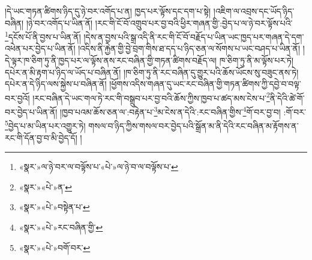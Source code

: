 །དེ་ཡང་གཏན་ཚིགས་ཉིད་དུ་ཉེ་བར་འགོད་པ་ན། ཁྱད་པར་ལྟོས་དང་དག་པ་སྟེ། །འཇིག་ལ་འབྲས་དང་ཡོད་ཉིད་བཞིན། །ཉེ་བར་འགོད་པ་ཡིན་ནོ། །རང་གི་ངོ་བོ་འགྲུབ་པར་བྱ་བའི་ཕྱིར་གཞན་གྱི་:བྱེད་པ་ལ་ཉེ་བར་ལྟོས་པའི་\footnote{«སྣར་»ལ་ཉེ་བར་ལ་བལྟོས་པ་«པེ་»ལ་ཉེ་བ་ལ་བལྟོས་པ་}དངོས་པོ་ནི་བྱས་པ་ཡིན་ནོ། །དེས་ན་བྱས་པའི་སྒྲ་འདི་ནི་རང་གི་ངོ་བོ་བརྗོད་པ་ཡིན་ཡང་ཁྱད་པར་གཞན་དེ་དག་འཕེན་པར་བྱེད་པ་ཡིན་ནོ། །འདིས་ནི་རྐྱེན་གྱི་བྱེ་བྲག་གིས་ཐ་དད་པ་ཉིད་ཅན་ལ་སོགས་པ་ཡང་བཤད་པ་ཡིན་ནོ། །དེ་ལྟར་ཁ་ཅིག་ཏུ་ནི་ཁྱད་པར་ལ་ལྟོས་ནས་རང་བཞིན་གྱི་གཏན་ཚིགས་བརྗོད་ལ། ཁ་ཅིག་ཏུ་ནི་མ་ལྟོས་པར་ཏེ། དཔེར་ན་མི་རྟག་པ་ཉིད་ལ་ཡོད་པ་བཞིན་ནོ། །ཁ་ཅིག་ཏུ་ནི་རང་བཞིན་དུ་གྱུར་པའི་ཆོས་ཡོངས་སུ་བཟུང་ནས་ཏེ། དཔེར་ན་དེ་ཉིད་ལས་སྐྱེས་པ་བཞིན་ནོ། །ཕྱོགས་འདིས་གཞན་དུ་ཡང་རང་བཞིན་གྱི་གཏན་ཚིགས་ཀྱི་དབྱེ་བ་བལྟ་བར་བྱའོ། །རང་བཞིན་དེ་ཡང་གལ་ཏེ་རང་གི་བསྒྲུབ་པར་བྱ་བའི་ཆོས་ཀྱིས་ཁྱབ་པ་ཚད་མས་ངེས་པ་\footnote{«སྣར་»«པེ་»ན་}ནི་དེའི་ཚེ་གོ་བར་བྱེད་པ་ཡིན་ནོ། །ཁྱབ་པའམ་ཆོས་ཅན་ལ་:བརྟེན་པ་\footnote{«སྣར་»«པེ་»བསྟེན་པ་}མ་ངེས་ན་དེའི་:རང་བཞིན་གྱིས་\footnote{«སྣར་»«པེ་»རང་བཞིན་གྱི་}གོ་བར་བྱ་བ། :གོ་བར་\footnote{«སྣར་»«པེ་»བགོ་བར་}བྱེད་པ་མ་ཡིན་པར་འགྱུར་ཏེ། གསལ་བ་ཉིད་ཀྱིས་གསལ་བར་བྱེད་པའི་སྒྲོན་མ་ནི་དེའི་རང་བཞིན་མ་རྟོགས་ན་རང་གི་དོན་བྱ་བ་མི་བྱེད་དོ། །

